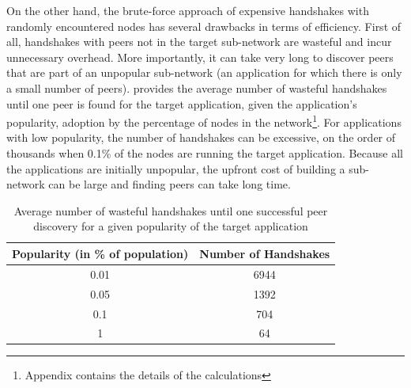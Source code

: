On the other hand, the brute-force approach of expensive handshakes with randomly encountered nodes has several drawbacks in terms of efficiency. First of all, handshakes with peers not in the target sub-network are wasteful and incur unnecessary overhead. More importantly, it can take very long to discover peers that are part of an unpopular sub-network (\ie an application for which there is only a small number of peers).  provides the average number of wasteful handshakes until one peer is found for the target application, given the application's popularity, \ie adoption by the percentage of nodes in the network\footnote{Appendix contains the details of the calculations}. For applications with low popularity, the number of handshakes can be excessive, \ie on the order of thousands when 0.1\% of the nodes are running the target application. Because all the applications are initially unpopular, the upfront cost of building a sub-network can be large and finding peers can take long time.


\begin{table} [!hbt]
\caption{Average number of wasteful handshakes until one successful peer discovery for a given popularity of the target application}
\label{tab:discv4Overhead}
\renewcommand{\arraystretch}{1.5}
\renewcommand{\tabcolsep}{0.5em}
\centering
\scriptsize{
\begin{tabular} {c|c}
\textbf{Popularity (in \% of population)} & \textbf{Number of Handshakes} \\
\hline
0.01 & 6944 \\ 
\hline
0.05 & 1392 \\
\hline
0.1 & 704 \\
\hline
1 & 64 \\
\bottomrule
\end{tabular}
}
\vspace{-0.2in}
\end{table}


